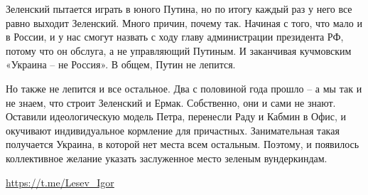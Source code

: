 Зеленский пытается играть в юного Путина, но по итогу каждый раз у него все
равно выходит Зеленский. Много причин, почему так. Начиная с того, что мало и в
России, и у нас смогут назвать с ходу главу администрации президента РФ, потому
что он обслуга, а не управляющий Путиным. И заканчивая кучмовским «Украина – не
Россия». В общем, Путин не лепится.

Но также не лепится и все остальное. Два с половиной года прошло – а мы так и
не знаем, что строит Зеленский и Ермак. Собственно, они и сами не знают.
Оставили идеологическую модель Петра, перенесли Раду и Кабмин в Офис, и
окучивают индивидуальное кормление для причастных. Занимательная такая
получается Украина, в которой нет места всем остальным. Поэтому, и появилось
коллективное желание указать заслуженное место зеленым вундеркиндам.

\url{https://t.me/Lesev_Igor}
